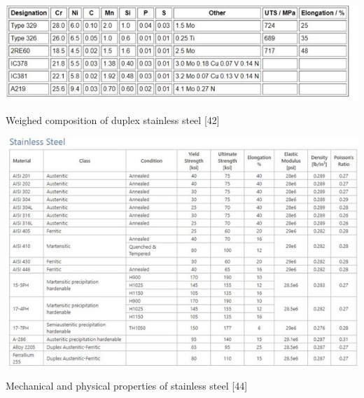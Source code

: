 \documentclass[12pt]{report}
\begin{document}
\begin{table}[H]
    \centering
    \includegraphics[width=\textwidth]{weighed_composition_of_duplex_stainless_steel.jpg}
    \caption{Weighed composition of duplex stainless steel [42]}
\end{table}

\begin{table}[H]
    \centering
    \includegraphics[width=\textwidth]{mechanical_and_physical_properties_of_stainless_steel.jpg}
    \caption{Mechanical and physical properties of stainless steel [44]}
\end{table}
\end{document}
